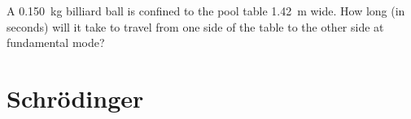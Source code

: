 \begin{example}
  A \SI{.150}{\kilo\gram} billiard ball is confined to the pool table
  \SI{1.42}{\metre} wide. How long (in seconds) will it take to travel from one
  side of the table to the other side at fundamental mode?
\end{example}
%
%
%
\section{Schr\"{o}dinger}
